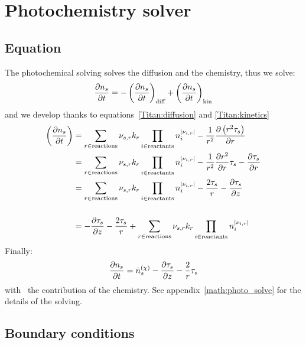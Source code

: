 \section{Photochemistry solver}

\subsection{Equation}

The photochemical solving solves the diffusion and the chemistry, thus we solve:
\begin{equation}
\frac{\partial n_s}{\partial t} = - \left(\frac{\partial n_s}{\partial t}\right)_\text{diff} + \left(\frac{\partial n_s}{\partial t}\right)_\text{kin}
\end{equation}
and we develop thanks to equations~\ref{Titan:diffusion} and \ref{Titan:kinetics}
\begin{equation}
\begin{split}
\left(\frac{\partial n_s}{\partial t}\right) & = \sum_{r\in \text{reactions}} {\nu_{s,r}}k_{r} \prod_{i\in\text{reactants}}n_i^{|{\nu_{i,r}}|} -
                                     \frac{1}{r^2}\frac{\partial\left(r^2\tau_s\right)}{\partial r} \\
                                 & = \sum_{r\in \text{reactions}} {\nu_{s,r}} k_r\prod_{i\in\text{reactants}}n_i^{|{\nu_{i,r}}|} -
                                     \frac{1}{r^2}\frac{\partial r^2}{\partial r}\tau_s - \frac{\partial\tau_s}{\partial r} \\
                                 & = \sum_{r\in \text{reactions}} {\nu_{s,r}} k_{r}\prod_{i\in\text{reactants}}n_i^{|{\nu_{i,r}}|} -
                                     \frac{2\tau_s}{r} - \frac{\partial\tau_s}{\partial z} \\[\baselineskip]
                                 & = - \frac{\partial\tau_s}{\partial z} - \frac{2\tau_s}{r} + \sum_{r\in \text{reactions}} {\nu_{s,r}} k_{r}\prod_{i\in\text{reactants}}n_i^{|{\nu_{i,r}}|} 
\end{split}
\end{equation}
Finally:
\begin{equation}
\frac{\partial n_s}{\partial t} = \dot{n}^{(\chi)}_s - \frac{\partial\tau_s}{\partial z} - \frac{2}{r}\tau_s
\label{Titan:photochem_eq}
\end{equation}
with \omegadot\ the contribution of the chemistry.
See appendix~\ref{math:photo_solve} for the details of the solving.

\subsection{Boundary conditions}

